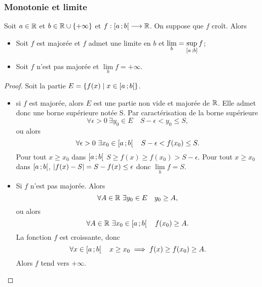 \subsubsection{Monotonie et limite}

\begin{theo}
  Soit $a \in \mathbb{R}$ et $b \in \mathbb{R}\cup\{+\infty\}$ et $f : \left[ a \, ;  b \right[ \longrightarrow \mathbb{R}$. On suppose que $f$ croît. Alors
  \begin{itemize}
  \item Soit $f$ est majorée et $f$ admet une limite en $b$ et $\lim\limits_{b} = \sup\limits_{\left[ a \, ;  b \right]}f$;
  \item Soit $f$ n'est pas majorée et $\lim\limits_{b}f=+\infty$.
  \end{itemize}
\end{theo}
\begin{proof}
  Soit la partie $E=\left\{f(x)\mathrel{}\middle|\mathrel{}x \in \left[ a \, ;  b \right[\right\}$.
  \begin{itemize}
  \item si $f$ est majorée, alors $E$ est une partie non vide et majorée de $\mathbb{R}$. Elle admet donc une borne supérieure notée S. Par caractérisation de la borne supérieure
    \begin{equation}
      \forall \epsilon >0 \ \exists y_0 \in E \quad S-\epsilon <y_0 \leq S,
    \end{equation}
    ou alors
    \begin{equation}
      \forall \epsilon >0 \ \exists x_0 \in \left[ a \, ;  b \right[ \quad S-\epsilon <f(x_0) \leq S.
    \end{equation}
    Pour tout $x \geq x_0$ dans $\left[ a \, ;  b \right[$ $S \geq f(x) \geq f(x_0) > S-\epsilon$. Pour tout $x \geq x_0$ dans $\left[ a \, ;  b \right[$, $\left\lvert f(x)-S\right\rvert=S-f(x) \leq \epsilon$ donc $\lim\limits_{b} f =S$.
  \item Si $f$ n'est pas majorée. Alors
    \begin{equation}
      \forall A \in \R \ \exists y_0 \in E \quad y_0 \geq A,
    \end{equation}
    ou alors
    \begin{equation}
      \forall A \in \mathbb{R} \ \exists x_0 \in \left[ a \, ;  b \right[ \quad f(x_0) \geq A.
    \end{equation}
    La fonction $f$ est croissante, donc
    \begin{equation}
      \forall x \in \left[ a \, ;  b \right[ \quad x \geq x_0 \implies f(x) \geq f(x_0) \geq A.
    \end{equation}
    Alors $f$ tend vers $+\infty$.
  \end{itemize}
\end{proof}

